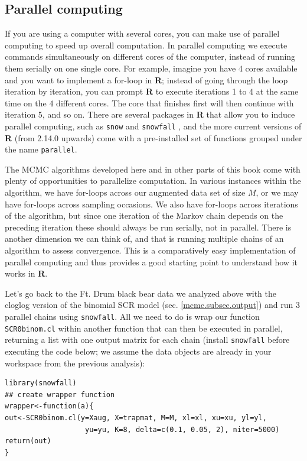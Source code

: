 \subsection{Parallel computing}
If you are using a computer with several cores, you can make use of parallel computing to speed up overall computation. In parallel computing we execute commands simultaneously on different cores of the computer, instead of running them serially on one single core. For example, imagine you have 4 cores available and you want to implement a for-loop in {\bf R}; instead of going through the loop iteration by iteration, you can prompt {\bf R} to execute iterations 1 to 4 at the same time on the 4 different cores. The core that finishes first will then continue with iteration 5, and so on.  There are several packages in {\bf R} that allow you to induce parallel computing, such as {\tt snow} \citep{tierney_etal:2011} and {\tt snowfall} \citep{knaus:2010}, and the more current versions of {\bf R} (from 2.14.0 upwards) come with a pre-installed set of functions grouped under the name {\tt parallel}.

The MCMC algorithms developed here and in other parts of this book come with plenty of opportunities to parallelize computation. In various instances within the algorithm, we have for-loops across our augmented data set of size $M$, or we may have for-loops across sampling occasions. We also have for-loops across iterations of the algorithm, but since one iteration of the Markov chain depends on the preceding iteration these should always be run serially, not in parallel. There is another dimension we can think of, and that is running multiple chains of an algorithm to assess convergence. This is a comparatively easy implementation of parallel computing and thus provides a good starting point to understand how it works in {\bf R}.

Let's go back to the Ft. Drum black bear data we analyzed above with the cloglog version of the binomial SCR model (sec. \ref{mcmc.subsec.output}) and run 3 parallel chains using {\tt snowfall}. All we need to do is wrap our function {\tt SCR0binom.cl} within another function that can then be executed in parallel, returning a list with one output matrix for each chain (install {\tt snowfall} before executing the code below; we assume the data objects are already in your workspace from the previous analysis):

{\small
\begin{verbatim}
library(snowfall)
## create wrapper function
wrapper<-function(a){
out<-SCR0binom.cl(y=Xaug, X=trapmat, M=M, xl=xl, xu=xu, yl=yl,
                   yu=yu, K=8, delta=c(0.1, 0.05, 2), niter=5000)
return(out)
}
\end{verbatim}
}

